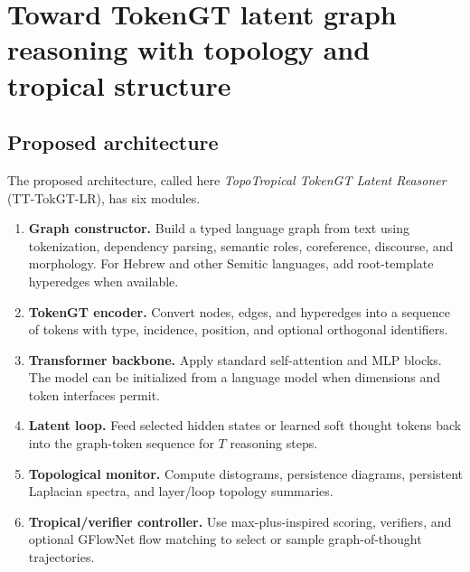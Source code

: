 \documentclass[11pt]{article}
\newcommand{\1}{\mathbf{1}}
\begin{document}
\section{Toward TokenGT latent graph reasoning with topology and tropical structure}

\subsection{Proposed architecture}

The proposed architecture, called here \emph{TopoTropical TokenGT Latent Reasoner} (TT-TokGT-LR), has six modules.

\begin{enumerate}
\item \textbf{Graph constructor.} Build a typed language graph from text using tokenization, dependency parsing, semantic roles, coreference, discourse, and morphology. For Hebrew and other Semitic languages, add root-template hyperedges when available.
\item \textbf{TokenGT encoder.} Convert nodes, edges, and hyperedges into a sequence of tokens with type, incidence, position, and optional orthogonal identifiers.
\item \textbf{Transformer backbone.} Apply standard self-attention and MLP blocks. The model can be initialized from a language model when dimensions and token interfaces permit.
\item \textbf{Latent loop.} Feed selected hidden states or learned soft thought tokens back into the graph-token sequence for $T$ reasoning steps.
\item \textbf{Topological monitor.} Compute distograms, persistence diagrams, persistent Laplacian spectra, and layer/loop topology summaries.
\item \textbf{Tropical/verifier controller.} Use max-plus-inspired scoring, verifiers, and optional GFlowNet flow matching to select or sample graph-of-thought trajectories.
\end{enumerate}
\end{document}

